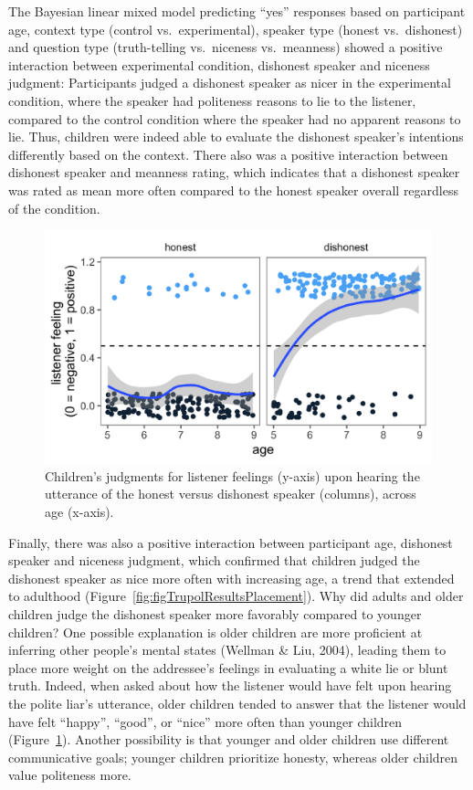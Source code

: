 \documentclass[oneside]{report}
\begin{document}
The Bayesian linear mixed model predicting ``yes'' responses based on
participant age, context type (control vs.~experimental), speaker type
(honest vs.~dishonest) and question type (truth-telling vs.~niceness
vs.~meanness) showed a positive interaction between experimental
condition, dishonest speaker and niceness judgment: Participants judged
a dishonest speaker as nicer in the experimental condition, where the
speaker had politeness reasons to lie to the listener, compared to the
control condition where the speaker had no apparent reasons to lie.
Thus, children were indeed able to evaluate the dishonest speaker's
intentions differently based on the context. There also was a positive
interaction between dishonest speaker and meanness rating, which
indicates that a dishonest speaker was rated as mean more often compared
to the honest speaker overall regardless of the condition.
\begin{figure}[t]

{\centering \includegraphics[width=0.9\linewidth]{erica_yoon_dissertation_files/figure-latex/figTrupolLfeelResultsPlacement-1} 

}

\caption[Listener feeling judgments in the experiment in Chapter 3.]{Children's judgments for listener feelings (y-axis) upon hearing the utterance of the honest versus dishonest speaker (columns), across age (x-axis).}\label{fig:figTrupolLfeelResultsPlacement}
\end{figure}
Finally, there was also a positive interaction between participant age,
dishonest speaker and niceness judgment, which confirmed that children
judged the dishonest speaker as nice more often with increasing age, a
trend that extended to adulthood
(Figure~\ref{fig:figTrupolResultsPlacement}). Why did adults and older
children judge the dishonest speaker more favorably compared to younger
children? One possible explanation is older children are more proficient
at inferring other people's mental states (Wellman \& Liu, 2004),
leading them to place more weight on the addressee's feelings in
evaluating a white lie or blunt truth. Indeed, when asked about how the
listener would have felt upon hearing the polite liar's utterance, older
children tended to answer that the listener would have felt ``happy'',
``good'', or ``nice'' more often than younger children
(Figure~\ref{fig:figTrupolLfeelResultsPlacement}). Another possibility
is that younger and older children use different communicative goals;
younger children prioritize honesty, whereas older children value
politeness more.
\end{document}
